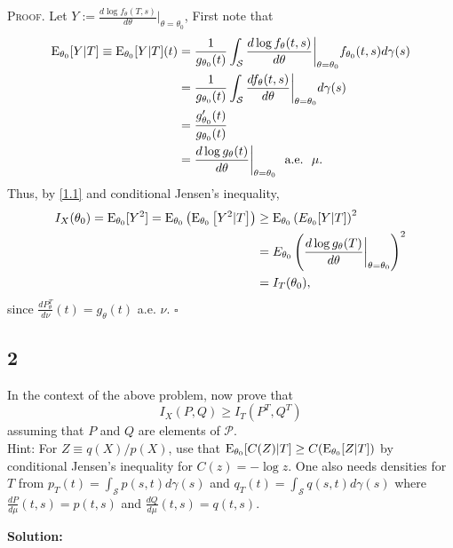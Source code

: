 \documentclass[12pt]{article}
\newcounter{ProofCounter}
\newenvironment{Proof}{\stepcounter{ProofCounter}\textsc{Proof.}}{\hfill$\square$}
\begin{document}
\begin{Proof}
  Let $Y:= \frac{ d \log f_\theta(T,s) } { d \theta} \big|_{\theta=\theta_0}$,
  First note that 
  \begin{align}
    \mathrm{E}_{\theta_0}[Y|T] \equiv \mathrm{E}_{\theta_0}[Y|T](t) & = \frac{1}{g_{\theta_0}(t)}\int_{\mathcal{S}}\frac{d\log f_{\theta}(t,s)}{d\theta}\bigg|_{\theta=\theta_0}
    f_{\theta_0}(t,s)d\gamma(s) \nonumber \\
    & = \frac{1}{g_{\theta_0}(t)}\int_{\mathcal{S}}\frac{df_{\theta}(t,s)}{d\theta}\bigg|_{\theta=\theta_0}d\gamma(s) \nonumber \\
    & = \frac{g_{\theta_0}'(t)}{g_{\theta_0}(t)} \nonumber \\
    & = \frac{d\log g_{\theta}(t)}{d\theta}\bigg|_{\theta = \theta_0} \ \ \text{a.e.}\ \  \mu.
    \label{1.1}
  \end{align}
  Thus, by \eqref{1.1} and conditional Jensen's inequality,
  \begin{align*}
    I_{X}(\theta_0) = \mathrm{E}_{\theta_0}[Y^{2}] = \mathrm{E}_{\theta_0}\left( \mathrm{E}_{\theta_0}\left[ Y^2|T \right] \right)
    & \geq \mathrm{E}_{\theta_0}\left( E_{\theta_0}[Y|T] \right)^2 \\
    & = E_{\theta_0}\left( \frac{d\log g_{\theta}(T)}{d\theta}\bigg|_{\theta=\theta_0} \right)^2  \\
    & = I_{T}(\theta_0),
  \end{align*}
  since $\frac{dP_{\theta}^{T}}{d\nu}(t) = g_{\theta}(t)$ a.e. $\nu$.
\end{Proof}


\newpage
\subsection*{2}
\begin{tcolorbox}
  In the context of the above problem, now prove that
  \[
    I_X(P,Q) \geq I_{T}(P^T,Q^T)
  \]
  assuming that $P$ and $Q$ are elements of $\mathcal{P}$.\\

  \noindent Hint:  For $Z\equiv  q(X)/p(X)$, use that $\mathrm{E}_{\theta_0}[ C(Z) |T] \geq C(\mathrm{E}_{\theta_0}[ Z |T])$ by conditional Jensen's inequality for $C(z)= - \log z $.  
  One also needs  densities for $T$ from $p_T(t) = \int_{\mathcal{S}}p(s,t) d\gamma(s)$ and
  $q_T(t) = \int_{\mathcal{S}}q(s,t) d\gamma(s)$ where $\frac{d P}{d \mu}(t,s) = p(t,s)$ and $\frac{d Q}{d \mu}(t,s) = q(t,s)$.
\end{tcolorbox}
\textbf{Solution:}
\end{document}
